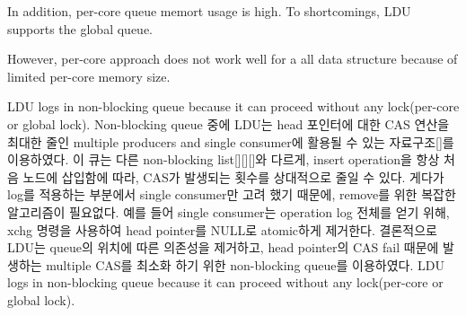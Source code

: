 In addition, per-core queue memort usage is high.
To shortcomings, LDU supports the global queue.


However, per-core approach does not work well for a all data structure because
of limited per-core memory size.


\fi

\ifkor
LDU logs in non-blocking queue because it can proceed without any lock(per-core
or global lock).
Non-blocking queue 중에 LDU는 head 포인터에 대한 CAS 연산을 최대한 줄인 multiple producers and
single consumer에 활용될 수 있는 자료구조[]를 이용하였다.
이 큐는 다른 non-blocking list[][][]와 다르게, insert operation을 항상 처음 노드에 삽입함에
따라, CAS가 발생되는 횟수를 상대적으로 줄일 수 있다.
게다가 log를 적용하는 부분에서 single consumer만 고려 했기 때문에, remove를 위한 복잡한 알고리즘이 필요없다. 
예를 들어 single consumer는 operation log 전체를 얻기 위해, xchg 명령을 사용하여 head pointer를
NULL로 atomic하게 제거한다. 
결론적으로 LDU는 queue의 위치에 따른 의존성을 제거하고, head pointer의 CAS fail 때문에 발생하는 multiple
CAS를 최소화 하기 위한 non-blocking queue를 이용하였다.
\else
LDU logs in non-blocking queue because it can proceed without any lock(per-core
or global lock).



